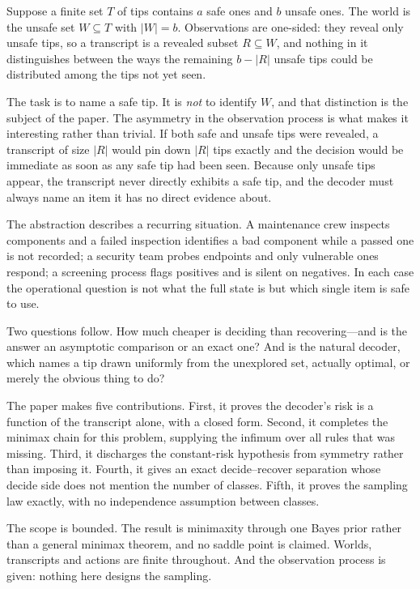 \documentclass[conference]{IEEEtran}
\theoremstyle{definition}
\begin{document}
Suppose a finite set $T$ of tips contains $a$ safe ones and $b$ unsafe ones. The world is the
unsafe set $W\subseteq T$ with $|W|=b$. Observations are one-sided: they reveal only unsafe
tips, so a transcript is a revealed subset $R\subseteq W$, and nothing in it distinguishes
between the ways the remaining $b-|R|$ unsafe tips could be distributed among the tips not yet
seen.

The task is to name a safe tip. It is \emph{not} to identify $W$, and that distinction is the
subject of the paper. The asymmetry in the observation process is what makes it interesting
rather than trivial. If both safe and unsafe tips were revealed, a transcript of size $|R|$
would pin down $|R|$ tips exactly and the decision would be immediate as soon as any safe tip
had been seen. Because only unsafe tips appear, the transcript never directly exhibits a safe
tip, and the decoder must always name an item it has no direct evidence about.

The abstraction describes a recurring situation. A maintenance crew inspects components and a
failed inspection identifies a bad component while a passed one is not recorded; a security
team probes endpoints and only vulnerable ones respond; a screening process flags positives
and is silent on negatives. In each case the operational question is not what the full state
is but which single item is safe to use.

Two questions follow. How much cheaper is deciding than recovering---and is the answer an
asymptotic comparison or an exact one? And is the natural decoder, which names a tip drawn
uniformly from the unexplored set, actually optimal, or merely the obvious thing to do?

The paper makes five contributions. First, it proves the decoder's risk is a function of the
transcript alone, with a closed form. Second, it completes the minimax chain for this problem,
supplying the infimum over all rules that was missing. Third, it discharges the constant-risk
hypothesis from symmetry rather than imposing it. Fourth, it gives an exact decide--recover
separation whose decide side does not mention the number of classes. Fifth, it proves the
sampling law exactly, with no independence assumption between classes.

The scope is bounded. The result is minimaxity through one Bayes prior rather than a general
minimax theorem, and no saddle point is claimed. Worlds, transcripts and actions are finite
throughout. And the observation process is given: nothing here designs the sampling.
\end{document}
